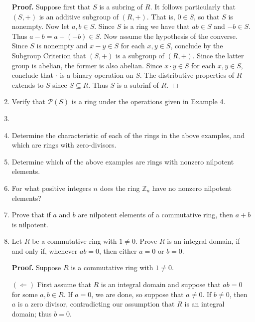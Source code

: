 \documentclass[9pt]{article}
\newcommand{\qed}{\hfill \ensuremath{\Box}}
\newcommand{\Z}{\mathbb{Z}}
\begin{document}
\begin{enumerate}
      \textbf{Proof.} Suppose first that $S$ is a subring of $R$. It follows 
      particularly that $(S, +)$ is an additive subgroup of $(R, +)$. That is,
      $0 \in S$, so that $S$ is nonempty. Now let $a, b \in S$. Since $S$ is a
      ring we have that $ab \in S$ and $-b \in S$. Thus
      $a - b = a + (-b) \in S$. Now assume the hypothesis of the converse. Since
      $S$ is nonempty and $x - y \in S$ for each $x, y \in S$, conclude by the
      Subgroup Criterion that $(S, +)$ is a subgroup of $(R, +)$. Since the
      latter group is abelian, the former is also abelian. Since
      $x \cdot y \in S$ for each $x, y \in S$, conclude that $\cdot$ is a binary
      operation on $S$. The distributive properties of $R$ extends to $S$ since
      $S \subseteq R$. Thus $S$ is a subrinf of $R$. \qed
   \item Verify that $\mathcal{P}(S)$ is a ring under the operations given in
         Example 4.
   \item 
   \item Determine the characteristic of each of the rings in the above
         examples, and which are rings with zero-divisors.
   \item Determine which of the above examples are rings with nonzero nilpotent
         elements.
   \item For what positive integers $n$ does the ring $\Z_n$ have no nonzero
         nilpotent elements?
   \item Prove that if $a$ and $b$ are nilpotent elements of a commutative ring,
         then $a + b$ is nilpotent.
   \item Let $R$ be a commutative ring with $1 \neq 0$. Prove $R$ is an integral
         domain, if and only if, whenever $ab = 0$, then either $a = 0$ or
         $b = 0$.
         
      \textbf{Proof.} Suppose $R$ is a commutative ring with $1 \neq 0$.
      
      $(\Leftarrow)$ First assume that $R$ is an integral domain and suppose that
      $ab = 0$ for some $a, b \in R$. If $a = 0$, we are done, so suppose that
      $a \neq 0$. If $b \neq 0$, then $a$ is a zero divisor, contradicting our
      assumption that $R$ is an integral domain; thus $b = 0$.
      

\end{enumerate}
\end{document}
